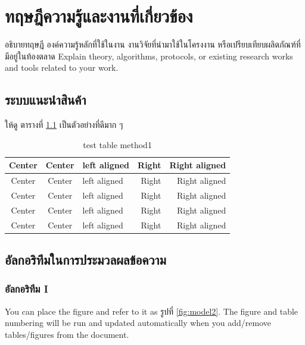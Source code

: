 \documentclass[12pt,oneside,openright,a4paper]{explo-thai-project}
\begin{document}

\chapter{ทฤษฎีความรู้และงานที่เกี่ยวข้อง}

อธิบายทฤษฎี องค์ความรู้หลักที่ใช้ในงาน งานวิจัยที่นำมาใช้ในโครงงาน หรือเปรียบเทียบผลิตภัณฑ์ที่มีอยู่ในท้องตลาด\cite{bworld}
Explain theory, algorithms, protocols, or existing research works and tools related to your work. 


\section{ระบบแนะนำสินค้า}
ให้ดู ตารางที่ \ref{tbl:method1} เป็นตัวอย่างที่ดีมาก ๆ
\begin{table}[!h]
\caption{test table method1}\label{tbl:method1}
\begin{tabular}{c|c|l|rr} \hline\hline
Center & Center & left aligned & Right & Right aligned \\ \hline\hline
Center & Center & left aligned & Right & Right aligned \\ \hline
Center & Center & left aligned & Right & Right aligned \\ 
Center & Center & left aligned & Right & Right aligned \\ \hline
Center & Center & left aligned & Right & Right aligned \\ \hline\hline
\end{tabular}
\end{table}


\section{อัลกอริทึมในการประมวลผลข้อความ}
\subsection{อัลกอริทึม I}

You can place the figure and refer to it as รูปที่ \ref{fig:model2}.
The figure and table numbering will be run and updated automatically when you add/remove tables/figures from the document.
\end{document}
